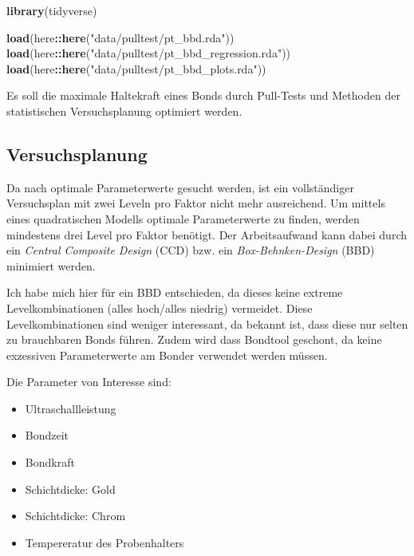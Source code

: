\documentclass[
  paper=a4,
  ,captions=tableheading
]{scrartcl}
\newenvironment{Shaded}{\begin{snugshade}}{\end{snugshade}}
\newcommand{\KeywordTok}[1]{\textcolor[rgb]{0.13,0.29,0.53}{\textbf{#1}}}
\newcommand{\NormalTok}[1]{#1}
\newcommand{\OperatorTok}[1]{\textcolor[rgb]{0.81,0.36,0.00}{\textbf{#1}}}
\newcommand{\StringTok}[1]{\textcolor[rgb]{0.31,0.60,0.02}{#1}}
\providecommand{\tightlist}{%
  \setlength{\itemsep}{0pt}\setlength{\parskip}{0pt}}
\begin{document}
\begin{Shaded}
\begin{Highlighting}[]
\KeywordTok{library}\NormalTok{(tidyverse)}
\end{Highlighting}
\end{Shaded}

\begin{Shaded}
\begin{Highlighting}[]
\KeywordTok{load}\NormalTok{(here}\OperatorTok{::}\KeywordTok{here}\NormalTok{(}\StringTok{"data/pulltest/pt_bbd.rda"}\NormalTok{))}
\KeywordTok{load}\NormalTok{(here}\OperatorTok{::}\KeywordTok{here}\NormalTok{(}\StringTok{"data/pulltest/pt_bbd_regression.rda"}\NormalTok{))}
\KeywordTok{load}\NormalTok{(here}\OperatorTok{::}\KeywordTok{here}\NormalTok{(}\StringTok{"data/pulltest/pt_bbd_plots.rda"}\NormalTok{))}
\end{Highlighting}
\end{Shaded}

Es soll die maximale Haltekraft eines Bonds durch Pull-Tests und Methoden der statistischen Versuchsplanung optimiert werden.

\hypertarget{pt-doe}{%
\subsection{Versuchsplanung}\label{pt-doe}}

Da nach optimale Parameterwerte gesucht werden, ist ein vollständiger Versuchsplan mit zwei Leveln pro Faktor nicht mehr ausreichend. Um mittels eines quadratischen Modells optimale Parameterwerte zu finden, werden mindestens drei Level pro Faktor benötigt. Der Arbeitsaufwand kann dabei durch ein \emph{Central Composite Design} (CCD) bzw. ein \emph{Box-Behnken-Design} (BBD) minimiert werden.

Ich habe mich hier für ein BBD entschieden, da dieses keine extreme Levelkombinationen (alles hoch/alles niedrig) vermeidet. Diese Levelkombinationen sind weniger interessant, da bekannt ist, dass diese nur selten zu brauchbaren Bonds führen. Zudem wird dass Bondtool geschont, da keine exzessiven Parameterwerte am Bonder verwendet werden müssen.

Die Parameter von Interesse sind:

\begin{itemize}
\tightlist
\item
  Ultraschallleistung
\item
  Bondzeit
\item
  Bondkraft
\item
  Schichtdicke: Gold
\item
  Schichtdicke: Chrom
\item
  Tempereratur des Probenhalters
\end{itemize}
\end{document}
